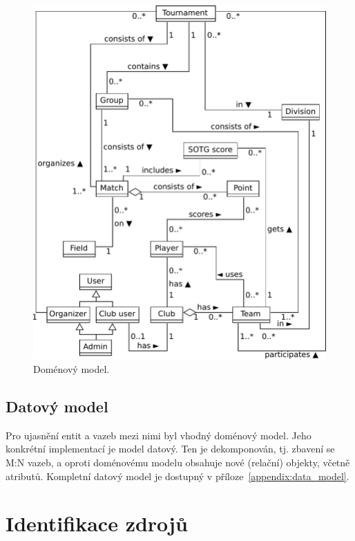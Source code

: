 \begin{figure}[ht!]
\centering
\includegraphics[width=130mm]{./images/domenovy-model.pdf}
\caption{Doménový model.\label{overflow}}
\label{fig:domain_model}
\end{figure}

\subsection{Datový model}

Pro ujasnění entit a vazeb mezi nimi byl vhodný doménový model. Jeho konkrétní implementací je model datový.
Ten je dekomponován, tj. zbavení se M:N vazeb, a oproti doménovému modelu obsahuje nové
(relační) objekty, včetně atributů. Kompletní datový model je dostupný v příloze~\ref{appendix:data_model}.

\section{Identifikace zdrojů}


